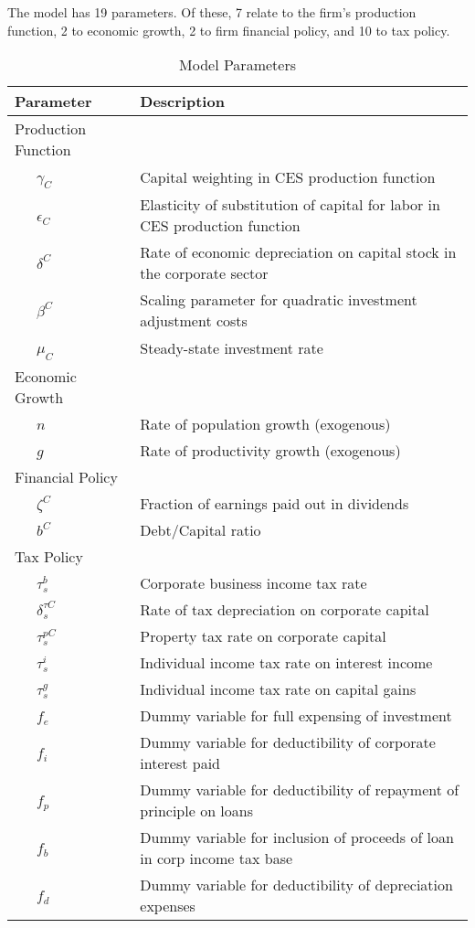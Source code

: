 The model has 19 parameters.  Of these, 7 relate to the firm's production function, 2 to economic growth, 2 to firm financial policy, and 10 to tax policy.

\begin{table}[htbp]
  \centering
  \caption{Model Parameters}
    \begin{tabular}{ll}
    \hline
    \hline
    Parameter & Description \\
    \hline
    Production Function &  \\
    \ \ \ $\gamma_{C}$ & Capital weighting in CES production function \\
    \ \ \ $\epsilon_{C}$ & Elasticity of substitution of capital for labor in CES production function \\
    \ \ \ $\delta^{C}$ & Rate of economic depreciation on capital stock in the corporate sector \\
    \ \ \ $\beta^{C}$ & Scaling parameter for quadratic investment adjustment costs \\
    \ \ \ $\mu_{C}$ & Steady-state investment rate \\
    Economic Growth &  \\
    \ \ \ $n$ & Rate of population growth (exogenous) \\
    \ \ \ $g$ & Rate of productivity growth (exogenous) \\
    Financial Policy &  \\
    \ \ \ $\zeta^{C}$ & Fraction of earnings paid out in dividends \\
    \ \ \ $b^{C}$ & Debt/Capital ratio \\
    Tax Policy &  \\
    \ \ \ $\tau^{b}_{s}$ & Corporate business income tax rate \\
    \ \ \ $\delta^{\tau C}_{s}$ & Rate of tax depreciation on corporate capital \\
    \ \ \ $\tau^{pC}_{s}$ & Property tax rate on corporate capital \\
    \ \ \ $\tau^{i}_{s}$ & Individual income tax rate on interest income \\
    \ \ \ $\tau^{g}_{s}$ & Individual income tax rate on capital gains \\
    \ \ \ $f_{e}$ & Dummy variable for full expensing of investment  \\
    \ \ \ $f_{i}$ & Dummy variable for deductibility of corporate interest paid \\
    \ \ \ $f_{p}$ & Dummy variable for deductibility of repayment of principle on loans \\
    \ \ \ $f_{b}$ & Dummy variable for inclusion of proceeds of loan in corp income tax base \\
    \ \ \ $f_{d}$ & Dummy variable for deductibility of depreciation expenses \\
    \hline
    \hline
    \end{tabular}%
  \label{tab:parameters}%
\end{table}%

